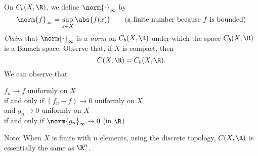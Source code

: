  On $C_b(X,\R)$, we define $\norm{\cdot}_\infty$ by
\[ \norm{f}_\infty = \sup_{x\in X}\abs{f(x)} \qquad \text{(a finite number because $f$ is bounded)} \]
\emph{Claim} that $\norm{\cdot}_\infty$ is a \emph{norm} on $C_b(X,\R)$ under which the space $C_b(X,\R)$ is a Banach space.  Observe that, if $X$ is compact, then
\[ C(X,\R) = C_b(X,\R) . \]
We can observe that
\begin{center}$f_n\to f$ uniformly on $X$ \\
if and only if $(f_n-f)\to0$ uniformly on $X$ \\
and $g_n\to0$ uniformly on $X$ \\
if and only if $\norm{g_n}_\infty\to0$ (in $\R$)
\end{center}
Note: When $X$ is finite with $n$ elements, using the discrete topology, $C(X,\R)$ is essentially the same as $\R^n$.
